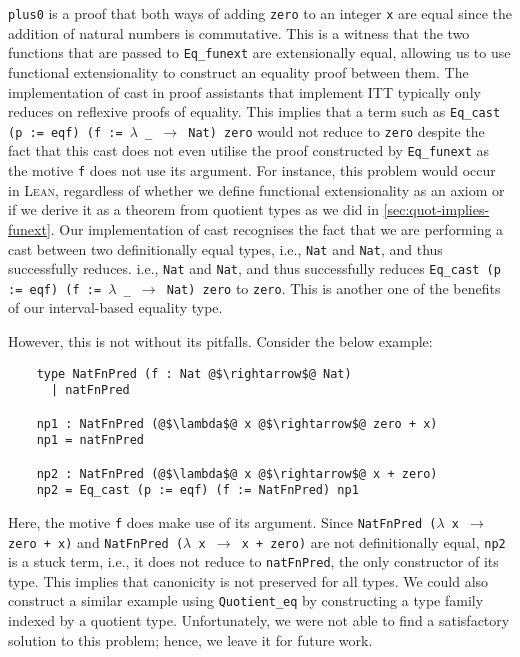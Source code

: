 \documentclass[12pt,twoside,maitrise]{dms}
\theoremstyle{definition}
\numberwithin{equation}{section}
\numberwithin{table}{chapter}
\numberwithin{figure}{chapter}
\newcommand\kw[1] {\textsf{#1}}
\newcommand\id[1] {\texttt{#1}}
\newcommand\fn[1] {\texttt{#1}}
\def\Lean{\textsc{Lean}\xspace}
\begin{document}
\id{plus0} is a proof that both ways of adding \id{zero} to an integer \id{x}
are equal since the addition of natural numbers is commutative. This is a
witness that the two functions that are passed to \id{Eq\_funext} are
extensionally equal, allowing us to use functional extensionality to construct
an equality proof between them. The implementation of \kw{cast} in proof
assistants that implement ITT typically only reduces on reflexive proofs of
equality. This implies that a term such as \fn{Eq\_cast (p := eqf) (f :=
$\lambda$ \_ $\rightarrow$ Nat) zero} would not reduce to \id{zero} despite the
fact that this cast does not even utilise the proof constructed by
\id{Eq\_funext} as the motive \id{f} does not use its argument. For instance,
this problem would occur in \Lean{}, regardless of whether we define functional
extensionality as an axiom or if we derive it as a theorem from quotient types
as we did in \autoref{sec:quot-implies-funext}. Our implementation of \kw{cast}
recognises the fact that we are performing a cast between two definitionally
equal types, i.e., \id{Nat} and \id{Nat}, and thus successfully reduces. i.e.,
\id{Nat} and \id{Nat}, and thus successfully reduces \fn{Eq_cast (p := eqf) (f
:= $\lambda$ _ $\rightarrow$ Nat) zero} to \id{zero}. This is another one of
the benefits of our interval-based equality type.

However, this is not without its pitfalls. Consider the below example:

\begin{verbatim}
    type NatFnPred (f : Nat @$\rightarrow$@ Nat)
      | natFnPred

    np1 : NatFnPred (@$\lambda$@ x @$\rightarrow$@ zero + x)
    np1 = natFnPred

    np2 : NatFnPred (@$\lambda$@ x @$\rightarrow$@ x + zero)
    np2 = Eq_cast (p := eqf) (f := NatFnPred) np1
\end{verbatim}

Here, the motive \id{f} does make use of its argument. Since \fn{NatFnPred
($\lambda$ x $\rightarrow$ zero + x)} and \fn{NatFnPred ($\lambda$ x
$\rightarrow$ x + zero)} are not definitionally equal, \id{np2} is a stuck
term, i.e., it does not reduce to \id{natFnPred}, the only constructor of its
type. This implies that canonicity is not preserved for all types. We could
also construct a similar example using \id{Quotient_eq} by constructing a type
family indexed by a quotient type. Unfortunately, we were not able to find a
satisfactory solution to this problem; hence, we leave it for future work.
\end{document}
